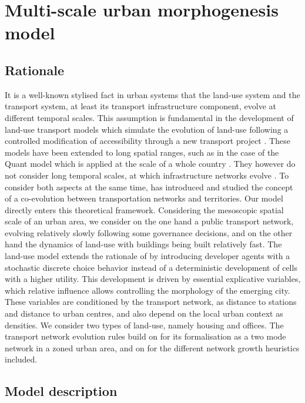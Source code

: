 \documentclass[letterpaper]{article}
\begin{document}
\section{Multi-scale urban morphogenesis model}

\subsection{Rationale}

It is a well-known stylised fact in urban systems that the land-use system and the transport system, at least its transport infrastructure component, evolve at different temporal scales. This assumption is fundamental in the development of land-use transport models which simulate the evolution of land-use following a controlled modification of accessibility through a new transport project \citep{wegener2004overview}. These models have been extended to long spatial ranges, such as in the case of the Quant model which is applied at the scale of a whole country \citep{batty2021new}. They however do not consider long temporal scales, at which infrastructure networks evolve \citep{lagesse2015spatial}. To consider both aspects at the same time, \cite{raimbault2018caracterisation} has introduced and studied the concept of a co-evolution between transportation networks and territories. Our model directly enters this theoretical framework. Considering the mesoscopic spatial scale of an urban area, we consider on the one hand a public transport network, evolving relatively slowly following some governance decisions, and on the other hand the dynamics of land-use with buildings being built relatively fast. The land-use model extends the rationale of \cite{raimbault2014hybrid} by introducing developer agents with a stochastic discrete choice behavior instead of a deterministic development of cells with a higher utility. This development is driven by essential explicative variables, which relative influence allows controlling the morphology of the emerging city. These variables are conditioned by the transport network, as distance to stations and distance to urban centres, and also depend on the local urban context as densities. We consider two types of land-use, namely housing and offices. The transport network evolution rules build on \cite{le2015modeling} for its formalisation as a two mode network in a zoned urban area, and on \cite{raimbault2018multi} for the different network growth heuristics included.


\subsection{Model description}
\end{document}

